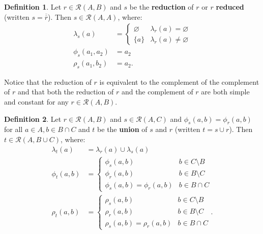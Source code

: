 \documentclass{article}
\theoremstyle{definition}
\newtheorem{definition}{Definition}[subsection]
\theoremstyle{plain}
\def\rule{\mathcal{R}}
\begin{document}
\begin{definition}
  Let $ r \in \rule (A, B) $
  and $ s $ be the \textbf{reduction} of $ r $ or $ r $ \textbf{reduced}
  (written $ s = \overline{\overline{r}} $).
  Then $ s \in \rule (A, A) $, where:
  \begin{align}
    \lambda_s (a)    & = \begin{cases}
                           \varnothing & \lambda_r (a) = \varnothing \\
                           \{ a \}     & \lambda_r (a) \neq \varnothing
                         \end{cases} \\
       \phi_s (a_1, a_2) & = a_2 \\
       \rho_s (a_1, b_2) & = a_2.
  \end{align}
\end{definition}

Notice that the reduction of $ r $ is equivalent to the complement of the complement of $ r $
and that both the reduction of $ r $ and the complement of $ r $ are both simple and constant for any $ r \in \rule (A, B) $.

\begin{definition}
  Let $ r \in \rule (A, B) $
  and $ s \in \rule (A, C) $
  and $ \phi_s (a, b) = \phi_r (a, b) $
  for all $ a \in A, b \in B \cap C $
  and $ t $ be the \textbf{union} of $ s $ and $ r $
  (written $ t = s \cup r $).
  Then $ t \in \rule (A, B \cup C) $, where:
  \begin{align}
    \lambda_t (a)    & = \lambda_r (a) \cup \lambda_s (a) \\
       \phi_t (a, b) & = \begin {cases}
                           \phi_s (a, b)                 & b \in C \setminus B \\
                           \phi_r (a, b)                 & b \in B \setminus C \\
                           \phi_s (a, b) = \phi_r (a, b) & b \in B \cap C
                         \end{cases} \\
        \rho_t (a, b) & = \begin {cases}
                           \rho_s (a, b)                 & b \in C \setminus B \\
                           \rho_r (a, b)                 & b \in B \setminus C \\
                           \rho_s (a, b) = \rho_r (a, b) & b \in B \cap C
                         \end{cases}. 
  \end{align}
\end{definition}
\end{document}
